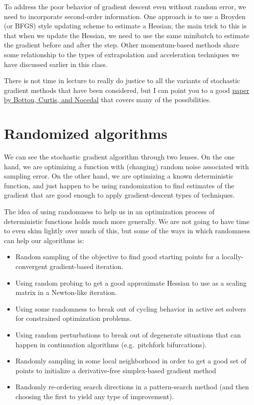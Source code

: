 \documentclass[12pt, leqno]{article} %
\providecommand{\tightlist}{%
  \setlength{\itemsep}{0pt}\setlength{\parskip}{0pt}}
\begin{document}
To address the poor behavior of gradient descent even without random
error, we need to incorporate second-order information. One approach is
to use a Broyden (or BFGS) style updating scheme to estimate a Hessian;
the main trick to this is that when we update the Hessian, we need to
use the same minibatch to estimate the gradient before and after the
step. Other momentum-based methods share some relationship to the types
of extrapolation and acceleration techniques we have discussed earlier
in this class.

There is not time in lecture to really do justice to all the variants of
stochastic gradient methods that have been considered, but I can point
you to a good
\href{https://www.cs.cornell.edu/courses/cs6241/2019sp/readings/Bottou-2018-opt.pdf}{paper
by Bottou, Curtis, and Nocedal} that covers many of the possibilities.

\section{Randomized algorithms}

We can see the stochastic gradient algorithm through two lenses. On the
one hand, we are optimizing a function with (changing) random noise
associated with sampling error. On the other hand, we are optimizing a
known deterministic function, and just happen to be using randomization
to find estimates of the gradient that are good enough to apply
gradient-descent types of techniques.

The idea of using randomness to help us in an optimization process of
deterministic functions holds much more generally. We are not going to
have time to even skim lightly over much of this, but some of the ways
in which randomness can help our algorithms is:

\begin{itemize}
\tightlist
\item
  Random sampling of the objective to find good starting points for a
  locally-convergent gradient-based iteration.
\item
  Using random probing to get a good approximate Hessian to use as a
  scaling matrix in a Newton-like iteration.
\item
  Using some randomness to break out of cycling behavior in active set
  solvers for constrained optimization problems.
\item
  Using random perturbations to break out of degenerate situations that
  can happen in continuation algorithms (e.g.~pitchfork bifurcations).
\item
  Randomly sampling in some local neighborhood in order to get a good
  set of points to initialize a derivative-free simplex-based gradient
  method
\item
  Randomly re-ordering search directions in a pattern-search method (and
  then choosing the first to yield any type of improvement).
\end{itemize}
\end{document}
